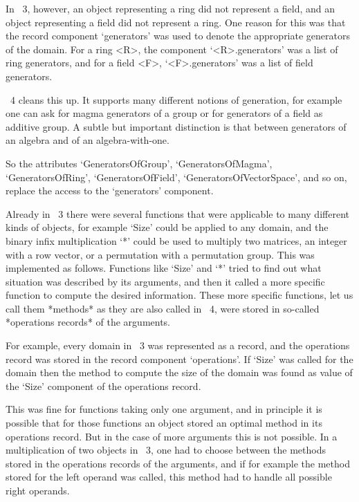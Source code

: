 In {\GAP}~3, however, an object representing a ring did not represent a
field, and an object representing a field did not represent a ring.
One reason for this was that the record component `generators' was used
to denote the appropriate generators of the domain.
For a ring <R>, the component `<R>.generators' was a list of ring
generators, and for a field <F>, `<F>.generators' was a list of field
generators.

{\GAP}~4 cleans this up.
It supports many different notions of generation,
for example one can ask for magma generators of a group
or for generators of a field as additive group.
A subtle but important distinction is that between generators of an
algebra and of an algebra-with-one.

So the attributes `GeneratorsOfGroup', `GeneratorsOfMagma',
`GeneratorsOfRing', `GeneratorsOfField', `GeneratorsOfVectorSpace',
and so on, replace the access to the `generators' component.



Already in {\GAP}~3 there were several functions that were applicable to
many different kinds of objects, for example `Size' could be applied to
any domain, and the binary infix multiplication `*' could be used to
multiply two matrices, an integer with a row vector, or a permutation
with a permutation group.
This was implemented as follows.
Functions like `Size' and `*' tried to find out what situation was
described by its arguments, and then it called a more specific function
to compute the desired information.
These more specific functions, let us call them *methods* as they are
also called in {\GAP}~4,
were stored in so-called *operations records* of the arguments.

For example, every domain in {\GAP}~3 was represented as a record, and
the operations record was stored in the record component `operations'.
If `Size' was called for the domain then the method to compute the size
of the domain was found as value of the `Size' component of the
operations record.

This was fine for functions taking only one argument,
and in principle it is possible that for those functions an object
stored an optimal method in its operations record.
But in the case of more arguments this is not possible.
In a multiplication of two objects in {\GAP}~3, one had to choose between
the methods stored in the operations records of the arguments,
and if for example the method stored for the left operand was called,
this method had to handle all possible right operands.


